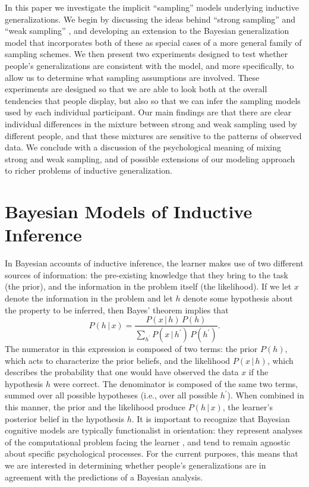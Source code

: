 \documentclass[doc]{apa6}
\newcommand{\p}{P}
\newcommand{\condon}{\, | \,}
\newcommand{\pgap}{\,}
\begin{document}
In this paper we investigate the implicit ``sampling'' models underlying inductive generalizations. We begin by discussing the ideas behind ``strong sampling'' and ``weak sampling'' \cite{Shepard1987,Tenenbaum2001}, and developing an extension to the Bayesian generalization model that incorporates both of these as special cases of a more general family of sampling schemes. We then present two experiments designed to test whether people's generalizations are consistent with the model, and more specifically, to allow us to determine what sampling assumptions are involved. These experiments are designed so that we are able to look both at the overall tendencies that people display, but also so that we can infer the sampling models used by each individual participant. Our main findings are that there are clear individual differences in the mixture between strong and weak sampling used by different people, and that these mixtures are sensitive to the patterns of observed data. We conclude with a discussion of the psychological meaning of mixing strong and weak sampling, and of possible extensions of our modeling approach to richer problems of inductive generalization.

\section{Bayesian Models of Inductive Inference}

In Bayesian accounts of inductive inference, the learner makes use of two different sources of information: the pre-existing knowledge that they bring to the task (the prior), and the information in the problem itself (the likelihood). If we let $x$ denote the information in the problem and let $h$ denote some hypothesis about the property to be inferred, then Bayes' theorem implies that
\begin{equation}
\p(h \condon x) = \frac{\p(x\condon h)\pgap \p(h)}{\sum_{h^\prime} \p(x\condon h^\prime) \pgap \p(h^\prime)}. \label{bayes}
\end{equation}
The numerator in this expression is composed of two terms: the prior $\p(h)$, which acts to characterize the prior beliefs, and the likelihood $\p(x\condon h)$, which describes the probability that one would have observed the data $x$ if the hypothesis $h$ were correct.  The denominator is composed of the same two terms, summed over all possible hypotheses (i.e., over all possible $h^\prime$). When combined in this manner, the prior and the likelihood produce $\p(h\condon x)$, the learner's posterior belief in the hypothesis $h$. It is important to recognize that Bayesian cognitive models are typically functionalist in orientation: they represent analyses of the computational problem facing the learner \cite{Marr1982}, and tend to remain agnostic about specific psychological processes. For the current purposes, this means that we are interested in determining whether people's generalizations are in agreement with the predictions of a Bayesian analysis.
\end{document}
